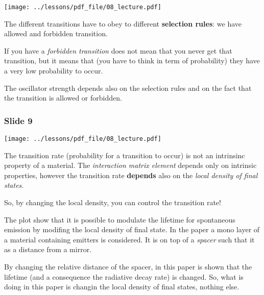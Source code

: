 \documentclass[../main/main.tex]{subfiles}
\begin{document}
\begin{minipage}[]{0.5\linewidth}
\centering
\texttt{[image: ../lessons/pdf\_file/08\_lecture.pdf]}
\end{minipage}
\hspace{0.3cm}
\vspace{0.3cm}
\begin{minipage}[c]{0.47\linewidth}

The different transitions have to obey to different \textbf{selection rules}: we have allowed and forbidden transition.

If you have a \emph{forbidden transition} does not mean that you never get that transition, but it means that (you have to think in term of probability) they have a very low probability to occur.

The oscillator strength depends also on the selection rules and on the fact that the transition is allowed or forbidden.

\end{minipage}

\subsubsection*{Slide 9}

\begin{minipage}[]{0.5\linewidth}
\centering
\texttt{[image: ../lessons/pdf\_file/08\_lecture.pdf]}
\end{minipage}
\hspace{0.3cm}
\vspace{0.3cm}
\begin{minipage}[c]{0.47\linewidth}

The transition rate (probability for a transition to occur) is not an intrinsinc property of a material. The \emph{interaction matrix element} depends only on intrinsic properties, however the transition rate \textbf{depends} also on the \emph{local density of final states}.

So, by changing the local density, you can control the transition rate!

The plot show that it is possible to modulate the lifetime for spontaneous emission by modifing the local density of final state. In the paper a mono layer of a material containing emitters is considered.
It is on top of a \emph{spacer} such that it as a distance from a mirror.

By changing the relative distance of the spacer, in this paper is shown that the lifetime (and a consequence the radiative decay rate) is changed. So, what is doing in this paper is changin the local density of final states, nothing else.

\end{minipage}
\end{document}
